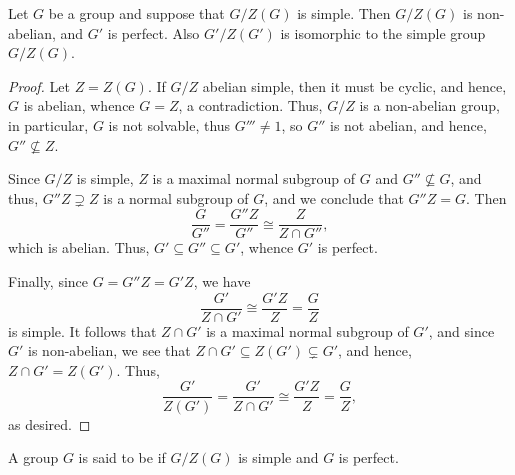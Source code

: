 \begin{lemma}
    Let $G$ be a group and suppose that $G/Z(G)$ is simple. Then $G/Z(G)$ is non-abelian, and $G'$ is perfect. Also $G'/Z(G')$ is isomorphic to the simple group $G/Z(G)$.
\end{lemma}
\begin{proof}
    Let $Z = Z(G)$. If $G/Z$ abelian simple, then it must be cyclic, and hence, $G$ is abelian, whence $G = Z$, a contradiction. Thus, $G/Z$ is a non-abelian group, in particular, $G$ is not solvable, thus $G'''\ne 1$, so $G''$ is not abelian, and hence, $G''\not\subseteq Z$.

    Since $G/Z$ is simple, $Z$ is a maximal normal subgroup of $G$ and $G''\not\subseteq G$, and thus, $G''Z\supsetneq Z$ is a normal subgroup of $G$, and we conclude that $G''Z = G$. Then 
    \begin{equation*}
        \frac{G}{G''} = \frac{G''Z}{G''}\cong\frac{Z}{Z\cap G''},
    \end{equation*}
    which is abelian. Thus, $G'\subseteq G''\subseteq G'$, whence $G'$ is perfect.

    Finally, since $G = G''Z = G'Z$, we have 
    \begin{equation*}
        \frac{G'}{Z\cap G'}\cong\frac{G'Z}{Z} = \frac{G}{Z}
    \end{equation*}
    is simple. It follows that $Z\cap G'$ is a maximal normal subgroup of $G'$, and since $G'$ is non-abelian, we see that $Z\cap G'\subseteq Z(G')\subsetneq G'$, and hence, $Z\cap G' = Z(G')$. Thus, 
    \begin{equation*}
        \frac{G'}{Z(G')} = \frac{G'}{Z\cap G'}\cong\frac{G'Z}{Z} = \frac{G}{Z},
    \end{equation*}
    as desired.
\end{proof}

\begin{definition}
    A group $G$ is said to be  if $G/Z(G)$ is simple and $G$ is perfect.
\end{definition}

